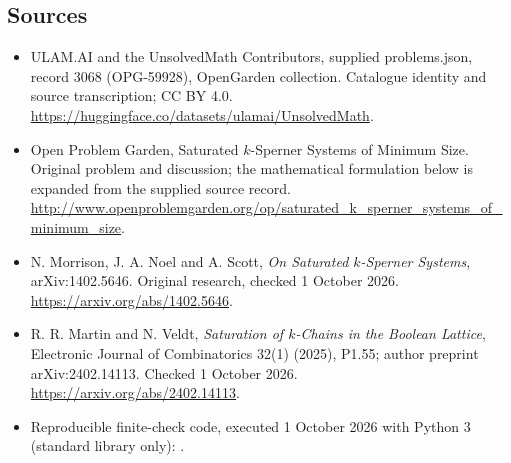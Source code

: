 \documentclass[11pt,a4paper]{article}
\begin{document}
\subsection{Sources}
\begin{itemize}
\item[S1] ULAM.AI and the UnsolvedMath Contributors, supplied problems.json, record 3068 (OPG-59928), OpenGarden collection. Catalogue identity and source transcription; CC BY 4.0.
\url{https://huggingface.co/datasets/ulamai/UnsolvedMath}.
\item[S2] Open Problem Garden, Saturated $k$-Sperner Systems of Minimum Size. Original problem and discussion; the mathematical formulation below is expanded from the supplied source record.
\url{http://www.openproblemgarden.org/op/saturated_k_sperner_systems_of_minimum_size}.
\item[S3] N. Morrison, J. A. Noel and A. Scott, \emph{On Saturated $k$-Sperner Systems}, arXiv:1402.5646. Original research, checked 1 October 2026.
\url{https://arxiv.org/abs/1402.5646}.
\item[S4] R. R. Martin and N. Veldt, \emph{Saturation of $k$-Chains in the Boolean Lattice}, Electronic Journal of Combinatorics 32(1) (2025), P1.55; author preprint arXiv:2402.14113. Checked 1 October 2026.
\url{https://arxiv.org/abs/2402.14113}.
\item[C1] Reproducible finite-check code, executed 1 October 2026 with Python 3 (standard library only):
.
\end{itemize}
\end{document}
